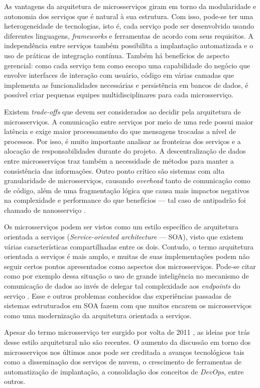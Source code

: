 As vantagens da arquitetura de microsserviços giram em torno da modularidade e autonomia dos serviços que é natural à sua estrutura. Com isso, pode-se ter uma heterogeneidade de tecnologias, isto é, cada serviço pode ser desenvolvido usando diferentes linguagens, \textit{frameworks} e ferramentas de acordo com seus requisitos. A independência entre serviços também possibilita a implantação automatizada e o uso de práticas de integração contínua. Também há benefícios de aspecto gerencial: como cada serviço tem como escopo uma capabilidade do negócio que envolve interfaces de interação com usuário, código em várias camadas que implementa as funcionalidades necessárias e persistência em bancos de dados, é possível criar pequenas equipes multidisciplinares para cada microsserviço.

Existem \emph{trade-offs} que devem ser considerados ao decidir pela arquitetura de microsserviços. A comunicação entre serviços por meio de uma rede possui maior latência e exige maior processamento do que mensagens trocadas a nível de processos. Por isso, é muito importante analisar as fronteiras dos serviços e a alocação de responsabilidades durante do projeto. A descentralização de dados entre microsserviços traz também a necessidade de métodos para manter a consistência das informações. Outro ponto crítico são sistemas com alta granularidade de microsserviços, causando \emph{overhead} tanto de comunicação como de código, além de uma fragmentação lógica que causa mais impactos negativos na complexidade e performance do que benefícios --- tal caso de antipadrão foi chamado de nanosserviço \cite{rotem}.

Os microsserviços podem ser vistos como um estilo específico de arquitetura orientada a serviços (\textit{Service-oriented architecture} --- SOA), visto que existem várias características compartilhadas entre os dois. Contudo, o termo arquitetura orientada a serviços é mais amplo, e muitas de suas implementações podem não seguir certos pontos apresentados como aspectos dos microsserviços. Pode-se citar como por exemplo dessa situação o uso de grande inteligência no mecanismo de comunicação de dados ao invés de delegar tal complexidade aos \emph{endpoints} do serviço \cite{lewis}. Esse e outros problemas conhecidos das experiências passadas de sistemas estruturados em SOA fazem com que muitos encarem os microsserviços como uma modernização da arquitetura orientada a serviços.

Apesar do termo microsserviço ter surgido por volta de 2011 \cite{lewis}, as ideias por trás desse estilo arquitetural não são recentes. O aumento da discussão em torno dos microsserviços nos últimos anos pode ser creditada a avanços tecnológicos tais como a disseminação dos serviços de nuvem, o crescimento de ferramentas de automatização de implantação, a consolidação dos conceitos de \emph{DevOps}, entre outros.
